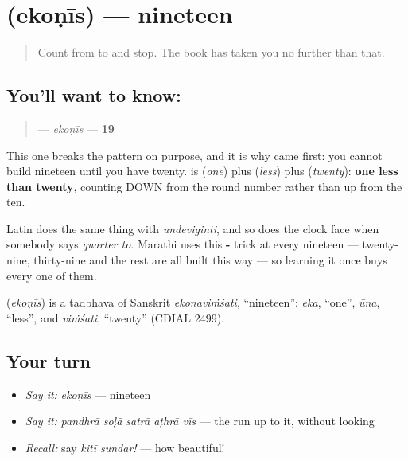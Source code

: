 \section[\texorpdfstring{\mr{एकोणीस} (ekoṇīs)}{एकोणीस (ekoṇīs)}]{ (ekoṇīs) — nineteen}

\label{lesson:MR-C58-ekonis}



\begin{quote}
Count from \textbf{} to \textbf{} and stop. The book has taken you no further than that.
\end{quote}

\subsection*{You'll want to know: }
\begin{quote}
\textbf{} — \emph{ekoṇīs} — \textbf{19}
\end{quote}

This one breaks the pattern on purpose, and it is why \textbf{} came first: you cannot build nineteen until you have twenty. \textbf{} is \textbf{} (\emph{one}) plus \textbf{} (\emph{less}) plus \textbf{} (\emph{twenty}): \textbf{one less than twenty}, counting DOWN from the round number rather than up from the ten.

Latin does the same thing with \emph{undeviginti}, and so does the clock face when somebody says \emph{quarter to}. Marathi uses this \textbf{-} trick at every nineteen — twenty-nine, thirty-nine and the rest are all built this way — so learning it once buys every one of them.

\begin{cousinweb}
\textbf{} (\emph{ekoṇīs}) is a tadbhava of Sanskrit \emph{ekonaviṁśati}, \textquotedblleft{}nineteen\textquotedblright{}: \emph{eka}, \textquotedblleft{}one\textquotedblright{}, \emph{ūna}, \textquotedblleft{}less\textquotedblright{}, and \emph{viṁśati}, \textquotedblleft{}twenty\textquotedblright{} (CDIAL 2499).
\end{cousinweb}

\subsection*{Your turn}
\begin{itemize}
\raggedright
  \item \emph{Say it:} \emph{ekoṇīs} — nineteen
  \item \emph{Say it:} \emph{pandhrā soḷā satrā aṭhrā vīs} — the run up to it, without looking
  \item \emph{Recall:} say \emph{kitī sundar!} — how beautiful!
\end{itemize}

